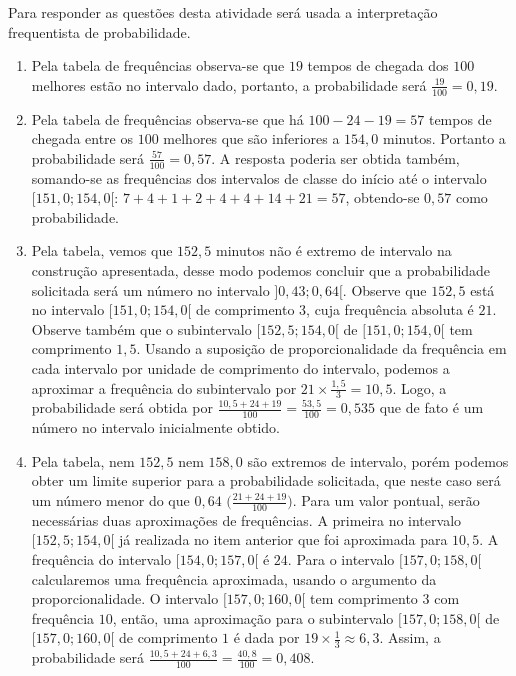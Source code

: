 \documentclass[10 pt,usenames,dvipsnames, oneside]{article}
\begin{document}
\ifdefined\prof
\begin{solucao}

Para responder as questões desta atividade será usada a interpretação frequentista de probabilidade.

\begin{enumerate}
\item Pela tabela de frequências observa-se que $19$ tempos de chegada dos $100$ melhores estão no intervalo dado, portanto, a probabilidade será $\frac{19}{100}=0{,}19$.

\item Pela tabela de frequências observa-se que há $100−24−19=57$ tempos de chegada entre os $100$ melhores que são inferiores a $154{,}0$ minutos. Portanto a probabilidade será $\frac{57}{100}=0{,}57$. A resposta poderia ser obtida também, somando-se as frequências dos intervalos de classe do início até o intervalo $[151{,}0 ; 154{,}0[$: $7+4+1+2+4+4+14+21=57$, obtendo-se $0{,}57$ como probabilidade.

\item Pela tabela, vemos que $152{,}5$ minutos não é extremo de intervalo na construção apresentada, desse modo podemos concluir que a probabilidade solicitada será um número no intervalo $]0{,}43 ; 0{,}64[$. Observe que $152{,}5$ está no intervalo $[151{,}0 ; 154{,}0[$ de comprimento 3, cuja frequência absoluta é $21$. Observe também que o subintervalo $[152{,}5; 154{,}0[$ de $[151{,}0 ; 154{,}0[$ tem comprimento $1{,}5$. Usando a suposição de proporcionalidade da frequência em cada intervalo por unidade de comprimento do intervalo, podemos a aproximar a frequência do subintervalo por $21\times\frac{1{,}5}{3}=10{,}5$. Logo, a probabilidade será obtida por $\frac{10{,}5+24+19}{100}=\frac{53{,}5}{100}=0{,}535$ que de fato é um número no intervalo inicialmente obtido.

\item Pela tabela, nem $152,5$ nem $158,0$ são extremos de intervalo, porém podemos obter um limite superior para a probabilidade solicitada, que neste caso será um número menor do que $0,64$ $\big(\frac{21+24+19}{100}\big)$. Para um valor pontual, serão necessárias duas aproximações de frequências. A primeira no intervalo $[152{,}5; 154{,}0[$ já realizada no item anterior que foi aproximada para $10{,}5$. A frequência do intervalo $[154{,}0 ; 157{,}0 [$ é $24$. Para o intervalo $[157{,}0 ; 158{,}0[$ calcularemos uma frequência aproximada, usando o argumento da proporcionalidade. O intervalo $[157{,}0 ; 160{,}0[$ tem comprimento $3$ com frequência $10$, então, uma aproximação para o subintervalo $[157{,}0 ; 158{,}0[$ de $[157{,}0 ; 160{,}0[$ de comprimento $1$ é dada por $19\times\frac{1}{3}\approx6{,}3$. Assim, a probabilidade será $\frac{10{,}5+24+6{,}3}{100}=\frac{40{,}8}{100}=0{,}408$.
\end{enumerate}

\end{solucao}
\fi
\end{document}
